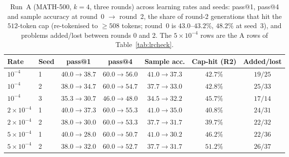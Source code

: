 \documentclass[runningheads]{llncs}
\begin{document}
\begin{table}[!htb]
\caption{Run~A (MATH-500, $k=4$, three rounds) across learning
rates and seeds: pass@1, pass@4 and sample accuracy at
round~0 $\to$ round~2, the share of round-2 generations that hit the
$512$-token cap (re-tokenised to $\ge508$ tokens; round~0 is
$43.0$--$43.2\%$, $48.2\%$ at seed~3), and problems added/lost between
rounds 0 and 2. The $5\times10^{-4}$ rows are the A rows
of Table~\ref{tab:lrcheck}.}
\label{tab:lrseries}
\centering
\setlength{\tabcolsep}{3pt}
\begin{tabular}{llccccc}
\toprule
Rate & Seed & pass@1 & pass@4 & Sample acc. & Cap-hit (R2) & Added/lost \\
\midrule
$10^{-4}$ & 1 & $40.0\to38.7$ & $60.0\to56.0$ & $41.0\to37.3$ & $42.7\%$ & $19/25$ \\
$10^{-4}$ & 2 & $38.0\to34.7$ & $60.0\to54.7$ & $37.7\to33.0$ & $42.8\%$ & $25/33$ \\
$10^{-4}$ & 3 & $35.3\to30.7$ & $46.0\to48.0$ & $34.5\to32.2$ & $45.7\%$ & $17/14$ \\
$2\times10^{-4}$ & 1 & $40.0\to37.3$ & $60.0\to55.3$ & $41.0\to35.0$ & $40.8\%$ & $24/31$ \\
$2\times10^{-4}$ & 2 & $38.0\to30.0$ & $60.0\to53.3$ & $37.7\to31.7$ & $39.7\%$ & $22/32$ \\
$5\times10^{-4}$ & 1 & $40.0\to28.0$ & $60.0\to50.7$ & $41.0\to30.2$ & $46.2\%$ & $22/36$ \\
$5\times10^{-4}$ & 2 & $38.0\to32.0$ & $60.0\to52.7$ & $37.7\to31.7$ & $51.2\%$ & $26/37$ \\
\bottomrule
\end{tabular}
\end{table}
\end{document}
